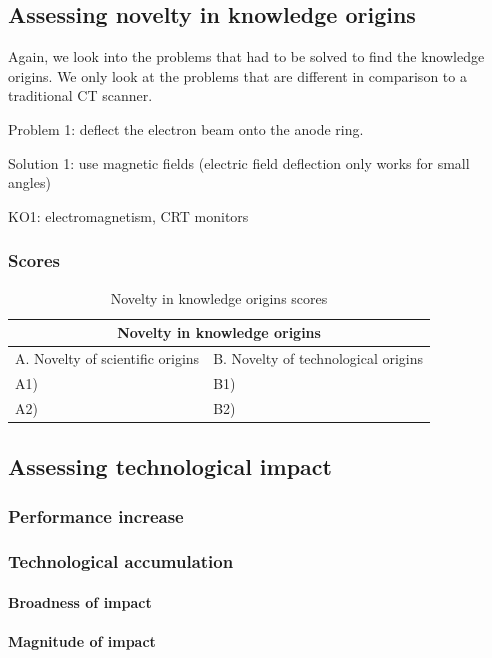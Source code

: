 \subsection{Assessing novelty in knowledge origins}
Again, we look into the problems that had to be solved to find the knowledge
origins. We only look at the problems that are different in comparison to a
traditional CT scanner.

Problem 1: deflect the electron beam onto the anode ring.

Solution 1: use magnetic fields (electric field deflection only works for small angles)

KO1: electromagnetism, CRT monitors

\subsubsection{Scores}
\begin{table}[h]
\centering
\begin{tabular}{l l}
\hline
\multicolumn{2}{|c|}{Novelty in knowledge origins} \\
\hline
A. Novelty of scientific origins & B. Novelty of technological origins\\
A1) & B1)\\ 
A2) & B2)\\ 
\hline
\end{tabular}
\caption{Novelty in knowledge origins scores}
\label{tbl:origscores2}
\end{table}

\subsection{Assessing technological impact}
\subsubsection{Performance increase}

\subsubsection{Technological accumulation}
\paragraph{Broadness of impact}

\paragraph{Magnitude of impact}

